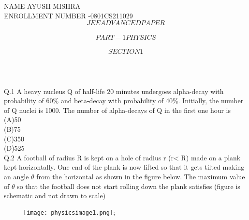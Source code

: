 \documentclass[11pt]{article}
\begin{document}
NAME-AYUSH MISHRA\\
ENROLLMENT NUMBER -0801CS211029  
$$JEE ADVANCED PAPER$$\\ 
 $$PART-1 PHYSICS$$\\
  $$SECTION1$$\\
\begin{center}
 \\
\end{center}       
Q.1 A heavy nucleus Q of half-life 20 minutes undergoes alpha-decay with probability of 60\% and beta-decay with probability of 40\%. Initially, the number of Q nuclei is 1000. The number of alpha-decays of Q in the first one hour is\\
(A)50\\    (B)75 \\      (C)350 \\     (D)525\\
Q.2 A football of radius R is kept on a hole of radius r (r< R) made on a plank kept horizontally. One end of the plank is now lifted so that it gets tilted making an angle $\theta$ from the horizontal as shown in the figure below. The maximum value of $\theta$ so that the football does not start rolling down the plank satisfies (figure is schematic and not drawn to scale)
\newpage
\begin{center}
\begin{figure}
\texttt{[image: physicsimage1.png]};
\end{figure}
\end{center}
\end{document}
